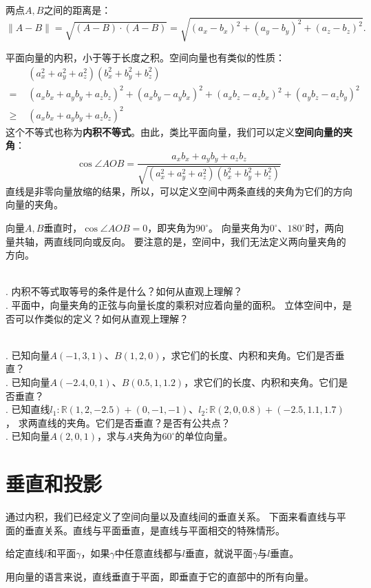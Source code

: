 \documentclass[12pt,UTF8,fontset=none]{ctexbook}
\begin{document}
两点$A,B$之间的距离是：
$$\|A-B\| = \sqrt{(A - B)\cdot(A-B)} = \sqrt{(a_x - b_x)^2 + (a_y-b_y)^2 + (a_z-b_z)^2}. $$

平面向量的内积，小于等于长度之积。空间向量也有类似的性质：
\begin{align*}
    &(a_x^2 + a_y^2 + a_z^2)(b_x^2 + b_y^2 + b_z^2)  \\
    =\,\,& (a_xb_x + a_yb_y + a_zb_z)^2 + (a_xb_y - a_yb_x)^2 + (a_xb_z - a_zb_x)^2 + (a_yb_z - a_zb_y)^2  \\
    \geqslant\,\,& (a_xb_x + a_yb_y + a_zb_z)^2  
\end{align*}
这个不等式也称为\textbf{内积不等式}。由此，类比平面向量，我们可以定义\textbf{空间向量的夹角}：
$$ \cos \angle AOB = \frac{a_xb_x + a_yb_y + a_zb_z}{\sqrt{(a_x^2 + a_y^2 + a_z^2)(b_x^2 + b_y^2 + b_z^2)}}$$
直线是非零向量放缩的结果，所以，可以定义空间中两条直线的夹角为它们的方向向量的夹角。

向量$A,B$垂直时，$\cos \angle AOB = 0$，即夹角为$90^\circ$。
向量夹角为$0^\circ$、$180^\circ$时，两向量共轴，两直线同向或反向。
要注意的是，空间中，我们无法定义两向量夹角的方向。

\begin{sk}
    \mbox{} \\
    . 内积不等式取等号的条件是什么？如何从直观上理解？\\
    . 平面中，向量夹角的正弦与向量长度的乘积对应着向量的面积。
    立体空间中，是否可以作类似的定义？如何从直观上理解？
\end{sk}

\begin{xt}
    \mbox{} \\
    . 已知向量$A(-1, 3, 1)$、$B(1, 2, 0)$，求它们的长度、内积和夹角。它们是否垂直？\\
    . 已知向量$A(-2.4, 0, 1)$、$B(0.5, 1, 1.2)$，求它们的长度、内积和夹角。它们是否垂直？\\
    . 已知直线$l_1: \mathbb{R}(1,2,-2.5) + (0,-1,-1)$、$l_2: \mathbb{R}(2,0,0.8) + (-2.5,1.1,1.7)$，
    求两直线的夹角。它们是否垂直？是否有公共点？\\
    . 已知向量$A(2, 0, 1)$，求与$A$夹角为$60^\circ$的单位向量。
\end{xt}

\section{垂直和投影}

通过内积，我们已经定义了空间向量以及直线间的垂直关系。
下面来看直线与平面的垂直关系。直线与平面垂直，是直线与平面相交的特殊情形。
\begin{df}\label{df:1-3-10}
    给定直线$l$和平面$\gamma$，如果$\gamma$中任意直线都与$l$垂直，就说平面$\gamma$与$l$垂直。
\end{df}
用向量的语言来说，直线垂直于平面，即垂直于它的直部中的所有向量。
\end{document}

